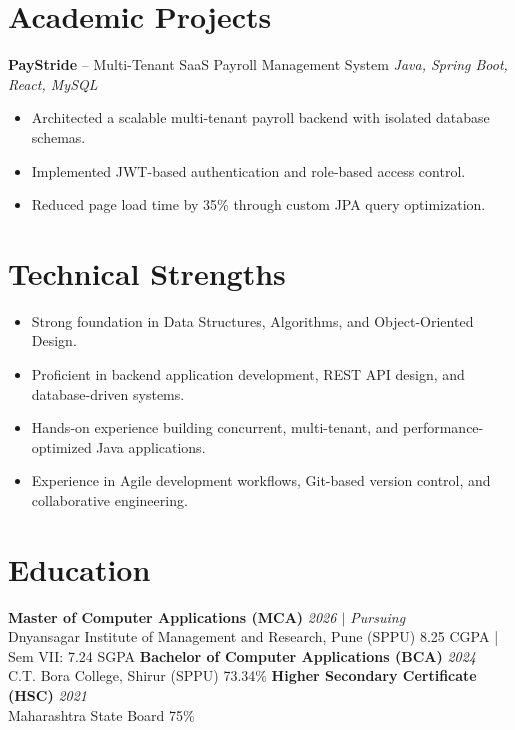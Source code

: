 \documentclass[10.5pt,a4paper]{article}
\begin{document}
\section{Academic Projects}
\textbf{PayStride} -- Multi-Tenant SaaS Payroll Management System \hfill \textit{Java, Spring Boot, React, MySQL}
\begin{itemize}
  \item Architected a scalable multi-tenant payroll backend with isolated database schemas.
  \item Implemented JWT-based authentication and role-based access control.
  \item Reduced page load time by 35\% through custom JPA query optimization.
\end{itemize}
\section{Technical Strengths}
\begin{itemize}
  \item Strong foundation in Data Structures, Algorithms, and Object-Oriented Design.
  \item Proficient in backend application development, REST API design, and database-driven systems.
  \item Hands-on experience building concurrent, multi-tenant, and performance-optimized Java applications.
  \item Experience in Agile development workflows, Git-based version control, and collaborative engineering.
\end{itemize}
\section{Education}
\textbf{Master of Computer Applications (MCA)} \hfill \textit{2026 $|$ Pursuing}\\
Dnyansagar Institute of Management and Research, Pune (SPPU) \hfill 8.25 CGPA | Sem VII: 7.24 SGPA
\vspace{2pt}
\textbf{Bachelor of Computer Applications (BCA)} \hfill \textit{2024}\\
C.T. Bora College, Shirur (SPPU) \hfill 73.34\%
\vspace{2pt}
\textbf{Higher Secondary Certificate (HSC)} \hfill \textit{2021}\\
Maharashtra State Board \hfill 75\%
\vspace{2pt}
\end{document}
